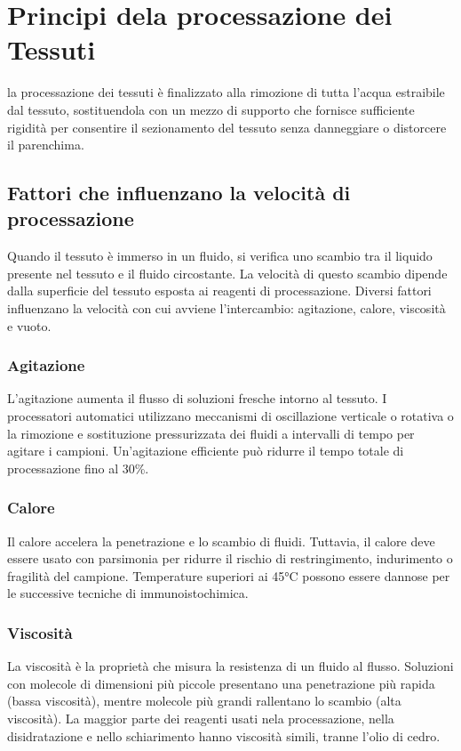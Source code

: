 \section{Principi dela processazione dei Tessuti}
la processazione dei tessuti è finalizzato alla rimozione di tutta l'acqua estraibile dal tessuto, sostituendola con un mezzo di supporto che fornisce sufficiente rigidità per consentire il sezionamento del tessuto senza danneggiare o distorcere il parenchima.

\subsection{Fattori che influenzano la velocità di processazione}
Quando il tessuto è immerso in un fluido, si verifica uno scambio tra il liquido presente nel tessuto e il fluido circostante. La velocità di questo scambio dipende dalla superficie del tessuto esposta ai reagenti di processazione. Diversi fattori influenzano la velocità con cui avviene l'intercambio: agitazione, calore, viscosità e vuoto.

\subsubsection{Agitazione}
L'agitazione aumenta il flusso di soluzioni fresche intorno al tessuto. I processatori automatici utilizzano meccanismi di oscillazione verticale o rotativa o la rimozione e sostituzione pressurizzata dei fluidi a intervalli di tempo per agitare i campioni. Un'agitazione efficiente può ridurre il tempo totale di processazione fino al 30\%.

\subsubsection{Calore}
Il calore accelera la penetrazione e lo scambio di fluidi. Tuttavia, il calore deve essere usato con parsimonia per ridurre il rischio di restringimento, indurimento o fragilità del campione. Temperature superiori ai 45°C possono essere dannose per le successive tecniche di immunoistochimica.

\subsubsection{Viscosità}
La viscosità è la proprietà che misura la resistenza di un fluido al flusso. Soluzioni con molecole di dimensioni più piccole presentano una penetrazione più rapida (bassa viscosità), mentre molecole più grandi rallentano lo scambio (alta viscosità). La maggior parte dei reagenti usati nela processazione, nella disidratazione e nello schiarimento hanno viscosità simili, tranne l'olio di cedro.

